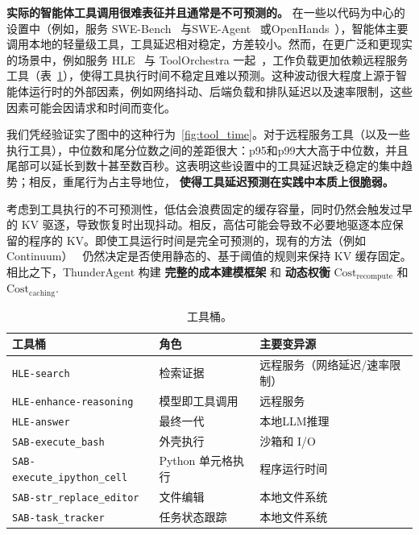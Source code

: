 \noindent\textbf{实际的智能体工具调用很难表征并且通常是不可预测的。} 在一些以代码为中心的设置中（例如，服务 SWE-Bench~\citep{jimenez2024swebenchlanguagemodelsresolve} 与SWE-Agent~\citep{yang2024sweagentagentcomputerinterfacesenable} 或OpenHands~\citep{wang2025openhandsopenplatformai}），智能体主要调用本地的轻量级工具，工具延迟相对稳定，方差较小。然而，在更广泛和更现实的场景中，例如服务 HLE~\citep{phan2025humanitysexam} 与 ToolOrchestra 一起~\citep{su2025toolorchestraelevatingintelligenceefficient}，工作负载更加依赖远程服务工具（表~\ref{tab:tool-buckets}），使得工具执行时间不稳定且难以预测。这种波动很大程度上源于智能体运行时的外部因素，例如网络抖动、后端负载和排队延迟以及速率限制，这些因素可能会因请求和时间而变化。

我们凭经验证实了图中的这种行为~\ref{fig:tool_time}。对于远程服务工具（以及一些执行工具），中位数和尾分位数之间的差距很大：p95和p99大大高于中位数，并且尾部可以延长到数十甚至数百秒。这表明这些设置中的工具延迟缺乏稳定的集中趋势；相反，重尾行为占主导地位， \textbf{使得工具延迟预测在实践中本质上很脆弱。}

考虑到工具执行的不可预测性，低估会浪费固定的缓存容量，同时仍然会触发过早的 KV 驱逐，导致恢复时出现抖动。相反，高估可能会导致不必要地驱逐本应保留的程序的 KV。即使工具运行时间是完全可预测的，现有的方法（例如Continuum）~\cite{li2025continuumefficientrobustmultiturn} 仍然决定是否使用静态的、基于阈值的规则来保持 KV 缓存固定。相比之下，ThunderAgent 构建 \textbf{完整的成本建模框架} 和 \textbf{动态权衡} $\text{Cost}_{\text{recompute}}$ 和 $\text{Cost}_{\text{caching}}$.








\begin{table}[!htbp]
\centering
\small
\setlength{\tabcolsep}{8pt}
\begin{tabular}{l l l}
\toprule
\textbf{工具桶} & \textbf{角色} & \textbf{主要变异源} \\
\midrule
\texttt{HLE-search} & 检索证据 & 远程服务（网络延迟/速率限制） \\
\texttt{HLE-enhance-reasoning} & 模型即工具调用 & 远程服务 \\
\texttt{HLE-answer} & 最终一代 & 本地LLM推理 \\
\midrule
\texttt{SAB-execute\_bash} & 外壳执行 & 沙箱和 I/O \\
\texttt{SAB-execute\_ipython\_cell} & Python 单元格执行 & 程序运行时间 \\
\texttt{SAB-str\_replace\_editor} & 文件编辑 & 本地文件系统 \\
\texttt{SAB-task\_tracker} & 任务状态跟踪 & 本地文件系统 \\
\bottomrule
\end{tabular}
\vspace{6pt}
\caption{工具桶。}
\label{tab:tool-buckets}
\end{table}





